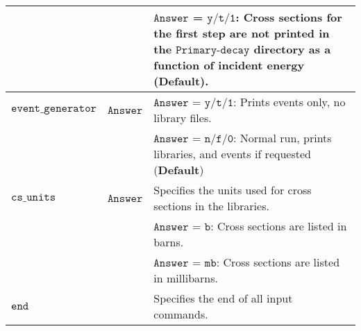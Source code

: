 \documentclass[
10pt,
showpacs,preprintnumbers,footinbib,
amsfonts,amsmath,amssymb,
aps,
prc,twocolumn,groupedaddress,superscriptaddress,
showkeys,
nofootinbib
]{revtex4-1}
\begin{document}
\begin{center}
\begin{tabular}{| p{4cm} | p{4cm} | p{9cm} |}
  &  &  ${\texttt{Answer}}$ = ${\texttt{y/t/1}}$: Cross sections for the first step are {\bf not} printed in the ${\texttt{Primary-decay}}$ directory as a function of incident energy ({\bf Default}). \\
\hline
${\texttt{event\_generator}}$ & ${\texttt{Answer}}$ & ${\texttt{Answer}}$ = ${\texttt{y/t/1}}$: Prints events only, no library files. \\
   &    & ${\texttt{Answer}}$ = ${\texttt{n/f/0}}$: Normal run, prints libraries, and events if requested ({\bf Default}) \\\hline
${\texttt{cs\_units}}$ & ${\texttt{Answer}}$ & Specifies the units used for cross sections in the libraries.\\
& & ${\texttt{Answer}}$ = ${\texttt{b}}$: Cross sections are listed in barns.\\
& & ${\texttt{Answer}}$ = ${\texttt{mb}}$: Cross sections are listed in millibarns.\\
\hline
${\texttt{end}}$ & & Specifies the end of all input commands.\\
\hline
\end{tabular}
\end{center}
\end{document}
